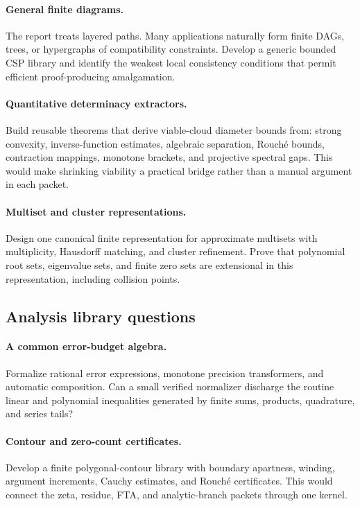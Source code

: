 \paragraph{General finite diagrams.}
The report treats layered paths.  Many applications naturally form finite
DAGs, trees, or hypergraphs of compatibility constraints.  Develop a generic
bounded CSP library and identify the weakest local consistency conditions that
permit efficient proof-producing amalgamation.

\paragraph{Quantitative determinacy extractors.}
Build reusable theorems that derive viable-cloud diameter bounds from:
strong convexity, inverse-function estimates, algebraic separation, Rouch\'e
bounds, contraction mappings, monotone brackets, and projective spectral gaps.
This would make shrinking viability a practical bridge rather than a manual
argument in each packet.

\paragraph{Multiset and cluster representations.}
Design one canonical finite representation for approximate multisets with
multiplicity, Hausdorff matching, and cluster refinement.  Prove that
polynomial root sets, eigenvalue sets, and finite zero sets are extensional in
this representation, including collision points.

\subsection{Analysis library questions}

\paragraph{A common error-budget algebra.}
Formalize rational error expressions, monotone precision transformers, and
automatic composition.  Can a small verified normalizer discharge the routine
linear and polynomial inequalities generated by finite sums, products,
quadrature, and series tails?

\paragraph{Contour and zero-count certificates.}
Develop a finite polygonal-contour library with boundary apartness, winding,
argument increments, Cauchy estimates, and Rouch\'e certificates.  This would
connect the zeta, residue, FTA, and analytic-branch packets through one kernel.

